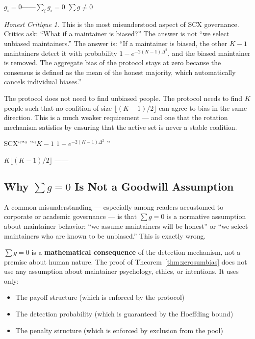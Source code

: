 \documentclass[12pt,a4paper]{article}
\theoremstyle{remark}
\newtheorem{honesthit}{Honest Critique}[section]
\newenvironment{hitbox}{%
  \begin{center}
  \color{red}
  \begin{minipage}{0.92\textwidth}
  \begin{honesthit}
}{%
  \end{honesthit}
  \end{minipage}
  \end{center}
}
\begin{document}
\noindent\textbf{}
$g_i = 0$——$\sum_i g_i = 0$
$\sum g \neq 0$

\begin{hitbox}
This is the most misunderstood aspect of SCX governance. Critics ask: ``What if
a maintainer is biased?'' The answer is not ``we select unbiased maintainers.''
The answer is: ``If a maintainer is biased, the other $K-1$ maintainers detect
it with probability $1 - e^{-2(K-1)\Delta^2}$, and the biased maintainer is
removed. The aggregate bias of the protocol stays at zero because the consensus
is defined as the mean of the honest majority, which automatically cancels
individual biases.''

The protocol does not need to find unbiased people. The protocol needs to find
$K$ people such that no coalition of size $\lfloor (K-1)/2 \rfloor$ can agree
to bias in the same direction. This is a much weaker requirement — and one
that the rotation mechanism satisfies by ensuring that the active set is never
a stable coalition.

\begin{center}
\small\textbf{}
SCX“”“
”“$K-1$
$1 - e^{-2(K-1)\Delta^2}$
”

$K$$\lfloor (K-1)/2 \rfloor$
——

\end{center}
\end{hitbox}

\subsection{Why $\sum g = 0$ Is Not a Goodwill Assumption}

A common misunderstanding — especially among readers accustomed to corporate or
academic governance — is that $\sum g = 0$ is a normative assumption about
maintainer behavior: ``we assume maintainers will be honest'' or ``we select
maintainers who are known to be unbiased.'' This is exactly wrong.

$\sum g = 0$ is a \textbf{mathematical consequence} of the detection mechanism,
not a premise about human nature. The proof of Theorem~\ref{thm:zerosumbias}
does not use any assumption about maintainer psychology, ethics, or intentions.
It uses only:
\begin{itemize}[leftmargin=*]
    \item The payoff structure (which is enforced by the protocol)
    \item The detection probability (which is guaranteed by the Hoeffding bound)
    \item The penalty structure (which is enforced by exclusion from the pool)
\end{itemize}
\end{document}
